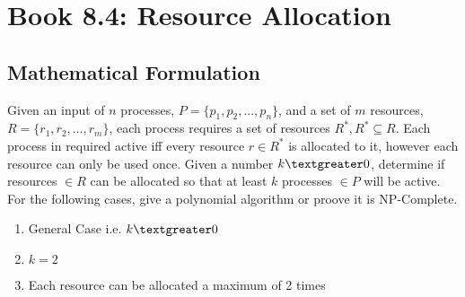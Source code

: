 \documentclass[12pt]{article}
\begin{document}

\newcommand{\hmwkClass}{COS 255}
\newcommand{\hmwkSemester}{Spring 2016}

\newcommand{\hmwkAuthorName}{Lukas Leung}
\newcommand{\hmwkAuthorID}{lleung}

\newcommand{\hmwkAssignmentNum}{4}

\newcommand{\hmwkProblemNum}{0}

\newcommand{\hmwkCollaborators}{}
\thispagestyle{fancycollab}



\section{Book 8.4: Resource Allocation}

\subsection*{Mathematical Formulation}
Given an input of $n$ processes, $P = \{p_1, p_2, ..., p_n\}$,  and a set of $m$
resources, $R = \{r_1, r_2, ..., r_m\}$, each process requires a set of resources
$R^{\ast}, R^{\ast} \subseteq R$. Each process in required active iff every resource
$r \in R^{\ast}$ is allocated to it, however each resource can only be used once.
Given a number $k \textgreater 0$, determine if resources $\in R$ can be allocated
so that at least $k$ processes $\in P$ will be active. For the following cases,
give a polynomial algorithm or proove it is NP-Complete.
\begin{enumerate}
    \item General Case i.e. $k \textgreater 0$
    \item $k = 2$
    \item Each resource can be allocated a maximum of 2 times
\end{enumerate}
\end{document}

